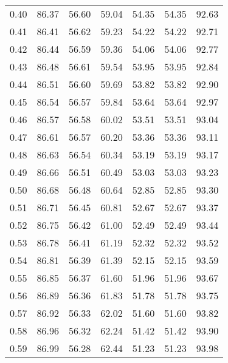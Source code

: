 \begin{tabular}{|c|c|c|c|c|c|c|}
      0.40 &     86.37 &     56.60 &      59.04 &   54.35 &      54.35 &         92.63 \\
      0.41 &     86.41 &     56.62 &      59.23 &   54.22 &      54.22 &         92.71 \\
      0.42 &     86.44 &     56.59 &      59.36 &   54.06 &      54.06 &         92.77 \\
      0.43 &     86.48 &     56.61 &      59.54 &   53.95 &      53.95 &         92.84 \\
      0.44 &     86.51 &     56.60 &      59.69 &   53.82 &      53.82 &         92.90 \\
      0.45 &     86.54 &     56.57 &      59.84 &   53.64 &      53.64 &         92.97 \\
      0.46 &     86.57 &     56.58 &      60.02 &   53.51 &      53.51 &         93.04 \\
      0.47 &     86.61 &     56.57 &      60.20 &   53.36 &      53.36 &         93.11 \\
      0.48 &     86.63 &     56.54 &      60.34 &   53.19 &      53.19 &         93.17 \\
      0.49 &     86.66 &     56.51 &      60.49 &   53.03 &      53.03 &         93.23 \\
      0.50 &     86.68 &     56.48 &      60.64 &   52.85 &      52.85 &         93.30 \\
      0.51 &     86.71 &     56.45 &      60.81 &   52.67 &      52.67 &         93.37 \\
      0.52 &     86.75 &     56.42 &      61.00 &   52.49 &      52.49 &         93.44 \\
      0.53 &     86.78 &     56.41 &      61.19 &   52.32 &      52.32 &         93.52 \\
      0.54 &     86.81 &     56.39 &      61.39 &   52.15 &      52.15 &         93.59 \\
      0.55 &     86.85 &     56.37 &      61.60 &   51.96 &      51.96 &         93.67 \\
      0.56 &     86.89 &     56.36 &      61.83 &   51.78 &      51.78 &         93.75 \\
      0.57 &     86.92 &     56.33 &      62.02 &   51.60 &      51.60 &         93.82 \\
      0.58 &     86.96 &     56.32 &      62.24 &   51.42 &      51.42 &         93.90 \\
      0.59 &     86.99 &     56.28 &      62.44 &   51.23 &      51.23 &         93.98 \\

\end{tabular}
